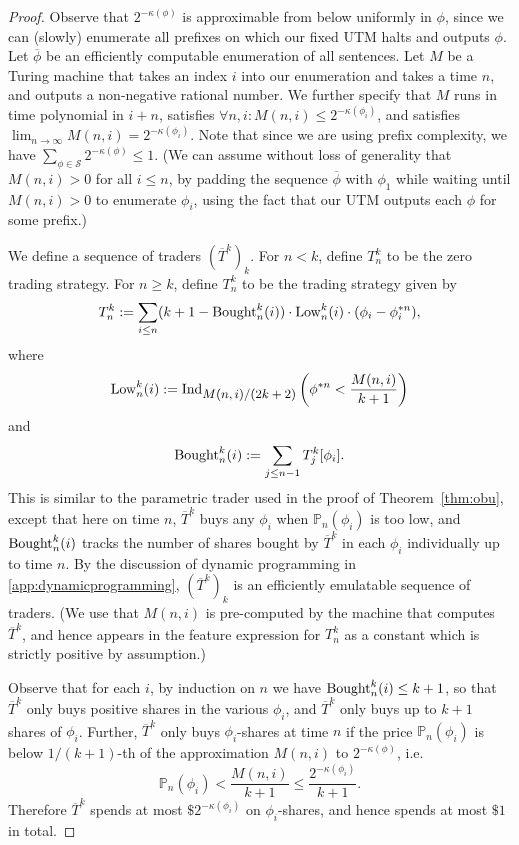\documentclass[authordate,onecolumn,noenvironments]{miri-tech-article}
\numberwithin{equation}{subsection}
\newcommand{\seq}[1]{{\overline{#1}}}
\newcommand{\nn}{n}
\newcommand{\phis}{\seq{\phi}}
\newcommand{\trade}{T}%
\newcommand{\Trader}{\seq{\trade}} %
\newcommand{\BelState}{\mathbb{P}}
\newcommand{\pf}[2][\nn]{{#2}^{*#1}}
\newcommand{\pt}{\BelState}
\newcommand{\Sentences}{\mathcal{S}}
\newcommand{\amountbought}{{\rm Bought}}
\newcommand{\lowprice}{{\rm Low}}
\newcommand{\ctsind}[1]{\operatorname{Ind}_{\text{\small{${#1}$}}}} %
\begin{document}
\begin{proof}
Observe  that $2^{-\kappa(\phi)}$ is approximable from below uniformly in $\phi$, since we can (slowly) enumerate all prefixes on which our fixed UTM halts
and outputs $\phi$. 
Let $\seq\phi$ be an efficiently computable enumeration of all sentences. Let $M$ be a Turing machine that takes an index $i$ into our enumeration and takes
a time $n$, and outputs a non-negative rational number. We further specify that $M$ runs in   
time polynomial in $i+n$, satisfies
$\forall n,i: M(n,i) \leq 2^{-\kappa(\phi_i)}$, and satisfies $\lim_{n\rightarrow\infty}M(n,i)=2^{-\kappa(\phi_i)}$. 
Note that since we are using prefix complexity,  we have $\sum_{\phi\in\Sentences}2^{-\kappa(\phi)}\leq 1$.  %
(We can assume without loss of generality that $M(n,i) >0$ for all $i \le n$, by padding the sequence $\phis$ with $\phi_1$ while waiting until $M(n,i)>0$ to
enumerate $\phi_i$,  using the fact that our UTM outputs each $\phi$ for some prefix.) 

We define  a sequence of traders $(\Trader^k)_k$. For $n<k$, define $\trade^k_n$ to be the zero trading strategy. For $n\geq k$, 
define $\trade^k_n$ to be the trading strategy given by 
%
\[\trade^k_\nn :=  \sum_{i \leq n} (k+1 - \amountbought^k_n(i)) \cdot \lowprice^k_n(i) \cdot (\phi_i - \phi_i^{* n})   ,\]
%
where 
%
\[ \lowprice^k_n(i) :=  \ctsind{M(n,i)/(2k + 2)}\left(\pf{\phi}<\frac{M(n,i)}{k + 1}\right)\] 
%
and
%
\[\amountbought^k_n(i) := \sum_{j \leq n-1} \trade^k_j[\phi_i] .\]
%
This is similar to the parametric trader used in the proof of Theorem~\ref{thm:obu}, except that here on time $n$,  $\Trader^k$ buys any $\phi_i$ when
$\pt_\nn(\phi_i)$ is too low, 
and  $\amountbought^k_n(i)$ tracks the number of shares bought by $\Trader^k$ in each $\phi_i$ individually up to time $n$. 
By the discussion of dynamic programming in \ref{app:dynamicprogramming}, $(\Trader^k)_k$ is an efficiently emulatable sequence of traders. (We use that $M(n,i)$ is pre-computed by the machine that computes
$\Trader^k$, and hence appears in
the feature expression for $\trade^k_n$ as a constant which is strictly positive by assumption.)

Observe that for each $i$, by induction on $n$ we have $\amountbought^k_n(i) \leq k+1$, so that $\Trader^k$ only buys positive shares in the various $\phi_i$, 
and $\Trader^k$ only buys up to $k + 1$ shares of $\phi_i$. 
Further,  $\Trader^k$ 
only buys $\phi_i$-shares at time $n$ if the price $\pt_\nn(\phi_i)$ is below $1/(k+1)$-th of the approximation $M(n,i)$ to $2^{-\kappa(\phi)}$, i.e. 
%
\[\pt_\nn(\phi_i) < \frac{M(n,i)}{k + 1} \leq \frac{2^{-\kappa(\phi_i)}}{k+1} .\]
%
Therefore $\Trader^k$
spends at most $\$ 2^{-\kappa(\phi_i)}$ on $\phi_i$-shares, and hence spends at most $\$ 1$ in total. 


\end{proof}
\end{document}
